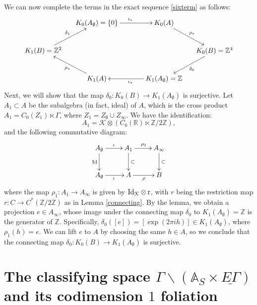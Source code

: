 \documentclass[letterpaper,11pt]{article}
\def\A{{\mathbb A}}
\theoremstyle{plain}
\begin{document}
 We can now complete the terms in the exact sequence \eqref{sixterm} as follows:
\[
\begin{gathered}
\xymatrix@C-1em{
& K_0(A_\emptyset) = \{0\} \ar[rr]^{\iota_*} && K_0(A) \ar[dr]^{\rho_*} \\
K_1(B) = \mathbb{Z}^2 \ar[ur]^{\delta_1} &&&& K_0(B) = \mathbb{Z}^4 \ar[dl]^{\delta_0} \\
& K_1(A) \ar[ul]^{\rho_*} && K_1(A_\emptyset) = \mathbb{Z} \ar[ll]^{\iota_*}
}
\end{gathered}
\]
Next, we will show that the map $ \delta_0 : K_0(B) \to K_1(A_\emptyset) $ is surjective. Let $ A_1 \subset A $ be the subalgebra (in fact, ideal) of $ A $, which is the cross product $ A_1 = C_0(Z_1) \ltimes \Gamma $, where $ Z_1 = Z_\emptyset \cup Z_\infty $. We have the identification:  
\[
A_1 = \mathcal{K} \otimes \left(C_0(\mathbb{R}) \ltimes \mathbb{Z}/2\mathbb{Z}\right),
\]
and the following commutative diagram:
\[
\xymatrix{
    A_\emptyset \ar[r]^\iota \ar[d]_{\rm Id}  & A_1 \ar[d]^\subset \ar[r]^{\rho_1} & A_\infty \ar[d]^\subset \\
    A_\emptyset \ar[r]_\iota & A \ar[r]_\rho & B
  }
\]
where the map $ \rho_1 : A_1 \to A_\infty $ is given by $ \rm{Id}_{\mathcal{K}} \otimes r $, with $ r $ being the restriction map $ r: C \to C^*(\mathbb{Z}/2\mathbb{Z}) $ as in Lemma \ref{connecting}. By the lemma, we obtain a projection $ e \in A_\infty $, whose image under the connecting map $ \delta_0 $ to $ K_1(A_\emptyset) = \mathbb{Z} $ is the generator of $ \mathbb{Z} $. Specifically, $ \delta_0([e]) = [\exp(2\pi i h)] \in K_1(A_\emptyset) $, where $ \rho_1(h) = e $. We can lift $ e $ to $ A $ by choosing the same $ h \in A $, so we conclude that the connecting map $ \delta_0 : K_0(B) \to K_1(A_\emptyset) $ is surjective.


 \vspace{.1in}









\section{The classifying space $\Gamma\backslash\left(\A_{S}\times\underline{E \Gamma}\right)$ and its codimension $1$ foliation} \label{sect5}
\end{document}
